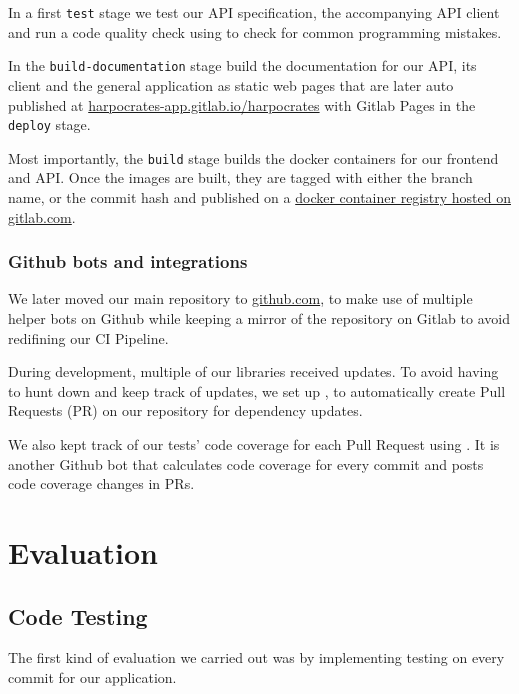 \documentclass[\version]{l4proj}
\begin{document}
In a first \verb|test| stage we test our API specification, the accompanying API client and run a code quality check using \textcite{Codeclimate2020} to check for common programming mistakes.

In the \verb|build-documentation| stage build the documentation for our API, its client and the general application as static web pages that are later auto published at \href{https://harpocrates-app.gitlab.io/harpocrates/}{harpocrates-app.gitlab.io/harpocrates} with Gitlab Pages in the \verb|deploy| stage.

Most importantly, the \verb|build| stage builds the docker containers for our frontend and API.
Once the images are built, they are tagged with either the branch name, or the commit hash and published on a \href{https://gitlab.com/harpocrates-app/harpocrates/container_registry}{docker container registry hosted on gitlab.com}.

\subsection{Github bots and integrations}

We later moved our main repository to \href{https://github.com/guillaumedsde/Harpocrates}{github.com}, to make use of multiple helper bots on Github while keeping a mirror of the repository on Gitlab to avoid redifining our CI Pipeline.

During development, multiple of our libraries received updates.
To avoid having to hunt down and keep track of updates, we set up \textcite{Dependabot2020}, to automatically create Pull Requests (PR) on our repository for dependency updates.

We also kept track of our tests' code coverage for each Pull Request using \textcite{Codecov2020}.
It is another Github bot that calculates code coverage for every commit and posts code coverage changes in PRs.

\chapter{Evaluation}

\section{Code Testing}

The first kind of evaluation we carried out was by implementing testing on every commit for our application.
\end{document}
